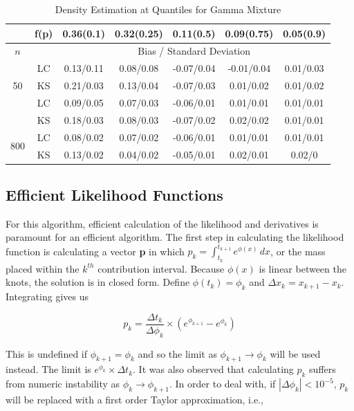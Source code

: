 \documentclass[12pt]{article}
\numberwithin{equation}{section}
\begin{document}
\begin{table}[H]
\begin{center}
\caption{Density Estimation at Quantiles for Gamma Mixture}

\begin{tabular} {| c | c | c | c | c | c | c | } 

	 \hline
		&f(p)&	0.36(0.1)&	0.32(0.25)&	0.11(0.5)&	0.09(0.75)&	0.05(0.9)\\ 
 \hline 
 	$n$ & & \multicolumn{5}{|c|}{Bias / Standard Deviation} 
 \\ 
 \hline 
\multirow{3}{*}{50}		&	LC	&0.13/0.11	&0.08/0.08	&-0.07/0.04	&-0.01/0.04	&0.01/0.03\\ 
			&	KS	&0.21/0.03	&0.13/0.04	&-0.07/0.03	&0.01/0.02	&0.01/0.02\\ 
	\hline 
\multirow{3}{*}{200}		&	LC	&0.09/0.05	&0.07/0.03	&-0.06/0.01	&0.01/0.01	&0.01/0.01\\ 
			&	KS	&0.18/0.03	&0.08/0.03	&-0.07/0.02	&0.02/0.02	&0.01/0.01\\ 
	\hline 
\multirow{3}{*}{800}		&	LC	&0.08/0.02	&0.07/0.02	&-0.06/0.01	&0.01/0.01	&0.01/0.01\\ 
			&	KS	&0.13/0.02	&0.04/0.02	&-0.05/0.01	&0.02/0.01	&0.02/0\\ 
	\hline 

\end{tabular}
\end{center}
\end{table}
		
	{\subsection{Efficient Likelihood Functions} } 	
	
	For this algorithm, efficient calculation of the likelihood and derivatives is paramount for an efficient algorithm. The first step in calculating the likelihood function is calculating a vector {\bf p} in which $p_k = \int_{t_k}^{t_{k+1}} e^ { \phi(x) } \,dx$, or the mass placed within the $k^{th}$ contribution interval. Because $\phi(x)$ is linear between the knots, the solution is in closed form. Define $\phi(t_k) = \phi_k$ and $\Delta x_k = x_{k+1} - x_k$. Integrating gives us 
	
	\[ p_k = \frac{\Delta t_k} {\Delta \phi_k } \times (e^{\phi_{k+1} } - e^{\phi_k } ) 
	\]
	
	This is undefined if $\phi_{k+1} = \phi_k$ and so the limit as $\phi_{k+1} \rightarrow \phi_k$ will be used instead. The limit is $e^{\phi_k} \times \Delta t_k$. It was also observed that calculating $p_k$ suffers from numeric instability as $\phi_k \rightarrow \phi_{k+1}$. In order to deal with, if $|\Delta\phi_k | < 10^{-5}$, $p_k$ will be replaced with a first order Taylor approximation, i.e., 
	
\end{document}
